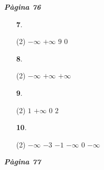 \documentclass[a4paper, pdf, twoside]{book}
\begin{document}
\begin{multicols}{2}

{\textbf{\em Pàgina 76}} \hrulefill
\begin{enumerate}
\vspace{0.25cm}



 \item[\fontfamily{phv}\selectfont\color{blue}\textbf{7}. ] 
 \begin{tasks}[column-sep=1em, item-indent=1.3333em](2)
	 \task $-\infty $
	 \task $+\infty $
	 \task $9$
	 \task $0$
\end{tasks}
 \end{enumerate}
\begin{enumerate}
\vspace{0.25cm}



 \item[\fontfamily{phv}\selectfont\color{blue}\textbf{8}. ] 
 \begin{tasks}[column-sep=1em, item-indent=1.3333em](2)
	 \task $-\infty $
	 \task $+\infty $
	 \task $+\infty $
\end{tasks}
\vspace{0.25cm}



 \item[\fontfamily{phv}\selectfont\color{blue}\textbf{9}. ] 
 \begin{tasks}[column-sep=1em, item-indent=1.3333em](2)
	 \task $1$
	 \task $+\infty $
	 \task $0$
	 \task $2$
\end{tasks}
\vspace{0.25cm}



 \item[\fontfamily{phv}\selectfont\color{blue}\textbf{10}. ]  \scalebox{0.6}{\simbolclau } 
 \begin{tasks}[column-sep=1em, item-indent=1.3333em](2)
	 \task $-\infty $
	 \task $-3$
	 \task $-1$
	 \task $-\infty $
	 \task $0$
	 \task $-\infty $
\end{tasks}
 \end{enumerate}
\vspace{0.3cm}


{\textbf{\em Pàgina 77}} \hrulefill
\begin{enumerate}
\vspace{0.25cm}



\end{enumerate}
\end{multicols}
\end{document}
